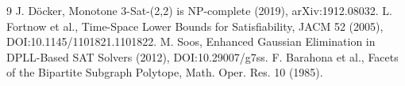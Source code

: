 \documentclass[11pt]{article}
\begin{document}
\begin{thebibliography}{9}
 J. D\"ocker, Monotone 3-Sat-(2,2) is NP-complete (2019), arXiv:1912.08032.
 L. Fortnow et al., Time-Space Lower Bounds for Satisfiability, JACM 52 (2005), DOI:10.1145/1101821.1101822.
 M. Soos, Enhanced Gaussian Elimination in DPLL-Based SAT Solvers (2012), DOI:10.29007/g7ss.
 F. Barahona et al., Facets of the Bipartite Subgraph Polytope, Math. Oper. Res. 10 (1985).
\end{thebibliography}
\end{document}
